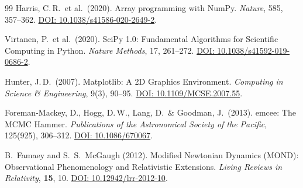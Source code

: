 \documentclass[aps,prd,twocolumn,superscriptaddress,nofootinbib]{revtex4-2}
\begin{document}
\begin{thebibliography}{99}
Harris, C.\,R.\ et al.\ (2020).
Array programming with NumPy.
\textit{Nature}, 585, 357--362.
\href{https://doi.org/10.1038/s41586-020-2649-2}{DOI: 10.1038/s41586-020-2649-2}.

Virtanen, P.\ et al.\ (2020).
SciPy 1.0: Fundamental Algorithms for Scientific Computing in Python.
\textit{Nature Methods}, 17, 261--272.
\href{https://doi.org/10.1038/s41592-019-0686-2}{DOI: 10.1038/s41592-019-0686-2}.

Hunter, J.\,D.\ (2007).
Matplotlib: A 2D Graphics Environment.
\textit{Computing in Science \& Engineering}, 9(3), 90--95.
\href{https://doi.org/10.1109/MCSE.2007.55}{DOI: 10.1109/MCSE.2007.55}.

Foreman-Mackey, D., Hogg, D.\,W., Lang, D.\ \& Goodman, J.\ (2013).
emcee: The MCMC Hammer.
\textit{Publications of the Astronomical Society of the Pacific}, 125(925), 306--312.
\href{https://doi.org/10.1086/670067}{DOI: 10.1086/670067}.

B.~Famaey and S.~S.~McGaugh (2012).
Modified Newtonian Dynamics (MOND): Observational Phenomenology and Relativistic Extensions.
\textit{Living Reviews in Relativity}, \textbf{15}, 10.
\href{https://doi.org/10.12942/lrr-2012-10}{DOI: 10.12942/lrr-2012-10}.

\end{thebibliography}
\end{document}
